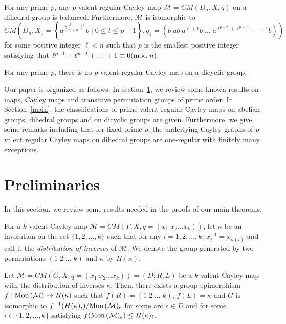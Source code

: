 \documentclass[12pt]{amsart}
\begin{document}
\begin{theorem} \label{main2}
For any prime $p$, any $p$-valent regular Cayley map $\mathcal{ M} =
CM(D_n, X, q)$ on a dihedral group is balanced. Furthermore, $\mathcal{ M}$
is isomorphic to
$$CM(D_n, X_1=\left\{a^{\sum_{j=0}^t
\ell^j}b\mid 0\leq t\leq p-1\right\}, q_1 = (b \; ab \;
a^{\ell+1}b \; \ldots \; a^{\ell^{p-2}+\ell^{p-3}+\ldots+1}b))
$$ for some positive integer $\ell < n$ such that
$p$ is the smallest positive integer satisfying that $\ell^{p-1} +
\ell^{p-2} + \ldots + 1 \equiv 0 ({\hbox{\rm mod }}  n)$.
\end{theorem}

\begin{theorem} \label{maindic}
For any prime $p$, there is no $p$-valent regular Cayley map on a
dicyclic group.
\end{theorem}

Our paper is organized as
follows. In section~\ref{pre}, we review some known results on maps, Cayley maps and transitive permutation groups of prime order.
 In Section~\ref{main}, the classifications of prime-valent regular
 Cayley maps on abelian groups, dihedral groups and on dicyclic
groups are given. Furthermore, we give some remarks including that
for fixed prime $p$, the underlying Cayley graphs of $p$-valent
regular Cayley maps on dihedral groups  are one-regular with
finitely many exceptions.

\section{Preliminaries}\label{pre}

In this section, we review some results needed in the proofs  of our main theorems.

For a $k$-valent Cayley map $ \mathcal{M} = CM(\Gamma, X, q =
(x_1\;x_2 \ldots x_k) )$, let $\kappa$  be an involution on the
set $\{1,2, \ldots, k \}$ such that for any $i = 1,2, \ldots, k$,
$x_i^{-1} = x_{\kappa(i)}$ and call it the \emph{distribution of
inverses} of $\mathcal{M}$. We denote the group generated by two
permutations $(1\;2\; \ldots \; k)$ and $\kappa$ by $H(\kappa)$.

\begin{prop} \label{homo-fromCay-to-one}
Let $\mathcal{ M} = CM(G, X, q = (x_1\;x_2 \ldots x_k) ) =
(D;R,L)$ be a $k$-valent Cayley map  with the distribution of
inverses $\kappa$. Then, there exists a group epimorphism $f:
{\mbox{\rm Mon\,}}(\mathcal{ M}) \rightarrow H(\kappa)$ such that $f(R) =
(1\;2\; \ldots \; k)$, $f(L) = \kappa$ and $G$ is isomorphic to
$f^{-1}(H(\kappa)_{i})/{\mbox{\rm Mon\,}}(\mathcal{ M})_{e}$ for some arc $e \in
D$ and for some $i \in \{ 1,2,\ldots, k \}$ satisfying
$f({\mbox{\rm Mon\,}}(\mathcal{ M})_{e}) \leq H(\kappa)_{i}$.
\end{prop}
\end{document}

